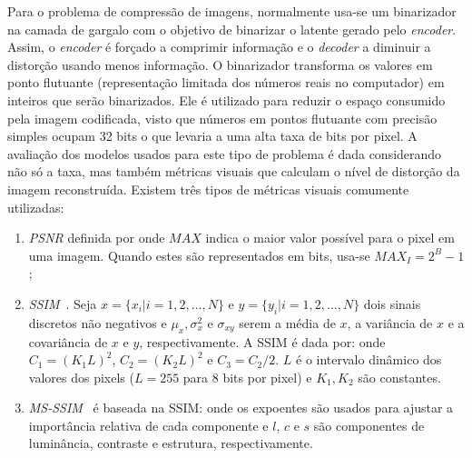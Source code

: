 Para o problema de compressão de imagens, normalmente usa-se um binarizador na camada de gargalo com o objetivo de binarizar o latente gerado pelo \textit{encoder}. Assim, o \textit{encoder} é forçado a comprimir informação e o \textit{decoder} a diminuir a distorção usando menos informação. O binarizador transforma os valores em ponto flutuante (representação limitada dos números reais no computador) em inteiros que serão binarizados. Ele é utilizado para reduzir o espaço consumido pela imagem codificada, visto que números em pontos flutuante com precisão simples ocupam 32 bits o que levaria a uma alta taxa de bits por pixel. A avaliação dos modelos usados para este tipo de problema é dada considerando não só a taxa, mas também métricas visuais que calculam o nível de distorção da imagem reconstruída. Existem três tipos de métricas visuais comumente utilizadas:
\begin{enumerate}
    \item \textit{\acrshort{PSNR}} definida por  onde $MAX$ indica o maior valor possível para o pixel em uma imagem. Quando estes são representados em bits, usa-se $MAX_I = 2^B - 1$;
    \item \textit{\acrshort{SSIM}}~\cite{wang2004image}. Seja $x = \{x_i|i = 1,2,\dots,N\}$ e $y = \{y_i|i = 1,2,\dots,N\}$ dois sinais discretos não negativos e $\mu_x, \sigma_x^2$ e $\sigma_{xy}$ serem a média de $x$, a variância de $x$ e a covariância de $x$ e $y$, respectivamente. A \acrshort{SSIM} é dada por:
     onde $C_1 = {(K_1L)}^2$, $C_2 = {(K_2L)}^2$ e $C_3 = C_2/2$. $L$ é o intervalo dinâmico dos valores dos pixels ($L = 255$ para 8 bits por pixel) e $K_1, K_2$ são constantes.
    \item \textit{\acrshort{MS-SSIM}}~\cite{wang2003multiscale} é baseada na \acrshort{SSIM}: 
    \equacao{MSSSIM}{MSSSIM(x,y) = {[l_M(x,y)]}^{\alpha M} \cdot \prod_{j=1}^{M}{[c_j(x,y)}^{\beta_j}{[s_j(x,y)]}^{\gamma_j},} onde os expoentes são usados para ajustar a importância relativa de cada componente e $l$, $c$ e $s$ são componentes de luminância, contraste e estrutura, respectivamente.
\end{enumerate}
